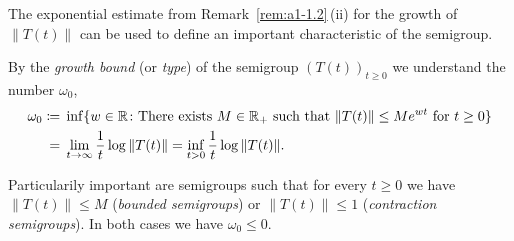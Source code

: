 The exponential estimate from Remark~\ref{rem:a1-1.2}\,(ii) for the growth of $\|T(t)\|$ can be used to define an important characteristic of the semigroup.
\begin{definition}\label{def:a1-1.3}
By the \emph{growth bound} (or \emph{type}) of the semigroup $(T(t))_{t\geq0}$ we understand the number $\omega_{0}$, 
\begin{align*}\label{eq:a1-1.1}
\omega_{0} \coloneqq{}& \inf\{w \in \mathbb{R} \colon \text{There exists } M \in \mathbb{R}_{+} \text{ such that } \|T(t)\| \leq Me^{wt} \text{ for } t \geq 0\} \\
={}& \lim_{t\to\infty} \frac{1}{t}\log\|T(t)\| = \inf_{t>0} \frac{1}{t}\log\|T(t)\| \notag .
\end{align*}
\end{definition}
Particularily important are semigroups such that for every $t \geq 0$ we have $\|T(t)\| \leq M$ (\emph{bounded semigroups}) or $\|T(t)\| \leq 1$ (\emph{contraction semigroups}).
In both cases we have $\omega_{0} \leq 0$.

